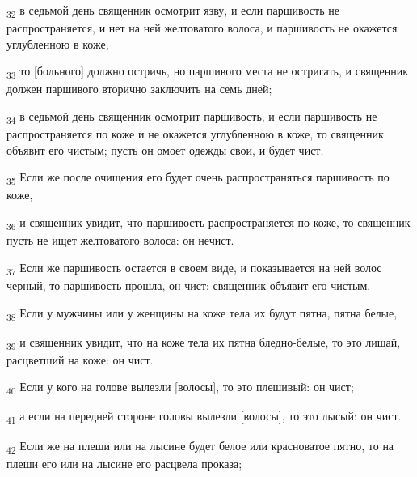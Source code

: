 \begin{tcolorbox}
\textsubscript{32} в седьмой день священник осмотрит язву, и если паршивость не распространяется, и нет на ней желтоватого волоса, и паршивость не окажется углубленною в коже,
\end{tcolorbox}
\begin{tcolorbox}
\textsubscript{33} то [больного] должно остричь, но паршивого места не остригать, и священник должен паршивого вторично заключить на семь дней;
\end{tcolorbox}
\begin{tcolorbox}
\textsubscript{34} в седьмой день священник осмотрит паршивость, и если паршивость не распространяется по коже и не окажется углубленною в коже, то священник объявит его чистым; пусть он омоет одежды свои, и будет чист.
\end{tcolorbox}
\begin{tcolorbox}
\textsubscript{35} Если же после очищения его будет очень распространяться паршивость по коже,
\end{tcolorbox}
\begin{tcolorbox}
\textsubscript{36} и священник увидит, что паршивость распространяется по коже, то священник пусть не ищет желтоватого волоса: он нечист.
\end{tcolorbox}
\begin{tcolorbox}
\textsubscript{37} Если же паршивость остается в своем виде, и показывается на ней волос черный, то паршивость прошла, он чист; священник объявит его чистым.
\end{tcolorbox}
\begin{tcolorbox}
\textsubscript{38} Если у мужчины или у женщины на коже тела их будут пятна, пятна белые,
\end{tcolorbox}
\begin{tcolorbox}
\textsubscript{39} и священник увидит, что на коже тела их пятна бледно-белые, то это лишай, расцветший на коже: он чист.
\end{tcolorbox}
\begin{tcolorbox}
\textsubscript{40} Если у кого на голове вылезли [волосы], то это плешивый: он чист;
\end{tcolorbox}
\begin{tcolorbox}
\textsubscript{41} а если на передней стороне головы вылезли [волосы], то это лысый: он чист.
\end{tcolorbox}
\begin{tcolorbox}
\textsubscript{42} Если же на плеши или на лысине будет белое или красноватое пятно, то на плеши его или на лысине его расцвела проказа;
\end{tcolorbox}
